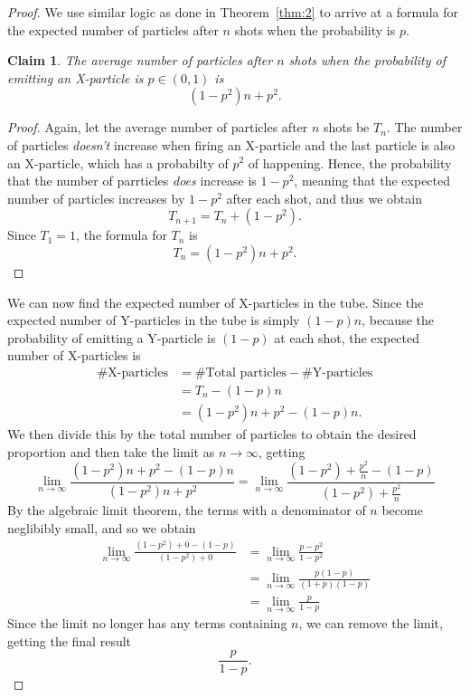 \documentclass{article}
\newtheorem{claim}{Claim}[theorem]
\begin{document}
\begin{proof}
  We use similar logic as done in Theorem~\ref{thm:2} to arrive at a formula for the expected number of particles after $n$ shots when the probability is $p$.
  \begin{claim}
    The average number of particles after $n$ shots when the probability of emitting an X-particle is $p \in (0, 1)$ is \[
      (1-p^2)n + p^2
    .\] 
  \end{claim}
  \begin{proof}
    Again, let the average number of particles after $n$ shots be $T_n$. The number of particles \emph{doesn't} increase when firing an X-particle and the last particle is also an X-particle, which has a probabilty of $p^2$ of happening. Hence, the probability that the number of parrticles \emph{does} increase is $1-p^2$, meaning that the expected number of particles increases by $1-p^2$ after each shot, and thus we obtain \[
      T_{n+1} = T_{n} + (1-p^2)
    .\] Since $T_1 = 1$, the formula for $T_{n}$ is \[
      T_{n} = (1-p^2)n + p^2 \tag*{\qedhere}
    .\] 
  \end{proof}
  We can now find the expected number of X-particles in the tube. Since the expected number of Y-particles in the tube is simply $(1 - p)n$, because the probability of emitting a Y-particle is $(1-p)$ at each shot, the expected number of X-particles is 
  \begin{align*}
    \#\text{X-particles} &= \#\text{Total particles} - \#\text{Y-particles} \\
                         &= T_n - (1-p)n \\
                         &= (1-p^2)n + p^2 - (1-p)n.
  \end{align*}
  We then divide this by the total number of particles to obtain the desired proportion and then take the limit as $n \to \infty$, getting 
  \begin{equation*}
    \lim_{n \to \infty} \frac{(1-p^2)n + p^2 - (1-p)n}{(1-p^2)n + p^2} = \lim_{n \to \infty} \frac{(1-p^2) + \frac{p^2}{n} - (1-p)}{(1-p^2) + \frac{p^2}{n}}
  \end{equation*}
  By the algebraic limit theorem, the terms with a denominator of $n$ become neglibibly small, and so we obtain 
  \begin{align*}
    \lim_{n \to \infty} \frac{(1-p^2) + 0 - (1-p)}{(1-p^2) + 0} &= \lim_{n \to \infty} \frac{p - p^2}{1 - p^2} \\
                                                                &= \lim_{n \to \infty} \frac{p(1 - p)}{(1+p)(1-p)} \\
                                                                &= \lim_{n \to \infty} \frac{p}{1-p}
  \end{align*}
  Since the limit no longer has any terms containing $n$, we can remove the limit, getting the final result \[
    \frac{p}{1-p} \tag*{\qedhere}
  .\] 
\end{proof}





\newpage
\inputminted{cpp}{ummrc.cpp}
\end{document}
